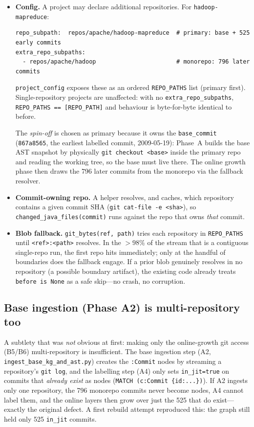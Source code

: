 \documentclass[11pt]{article}
\newcommand{\code}[1]{\texttt{#1}}
\begin{document}
\begin{itemize}
  \item \textbf{Config.} A project may declare additional repositories. For
  \code{hadoop-mapreduce}:
  \begin{lstlisting}
repo_subpath:  repos/apache/hadoop-mapreduce  # primary: base + 525 early commits
extra_repo_subpaths:
  - repos/apache/hadoop                       # monorepo: 796 later commits
  \end{lstlisting}
  \code{project\_config} exposes these as an ordered \code{REPO\_PATHS} list
  (primary first). Single-repository projects are unaffected: with no
  \code{extra\_repo\_subpaths}, \code{REPO\_PATHS == [REPO\_PATH]} and behaviour
  is byte-for-byte identical to before.

  The \emph{spin-off} is chosen as primary because it owns the
  \code{base\_commit} (\code{867a8565}, the earliest labelled commit,
  2009-05-19): Phase~A builds the base AST snapshot by physically
  \code{git checkout <base>} inside the primary repo and reading the working
  tree, so the base must live there. The online growth phase then draws the 796
  later commits from the monorepo via the fallback resolver.

  \item \textbf{Commit-owning repo.} A helper resolves, and caches, which
  repository contains a given commit SHA (\code{git cat-file -e <sha>}), so
  \code{changed\_java\_files(commit)} runs against the repo that owns
  \emph{that} commit.

  \item \textbf{Blob fallback.} \code{git\_bytes(ref, path)} tries each
  repository in \code{REPO\_PATHS} until \code{<ref>:<path>} resolves. In the
  $>98\%$ of the stream that is a contiguous single-repo run, the first repo
  hits immediately; only at the handful of boundaries does the fallback engage.
  If a prior blob genuinely resolves in no repository (a possible boundary
  artifact), the existing code already treats \code{before is None} as a safe
  skip---no crash, no corruption.
\end{itemize}

\subsection{Base ingestion (Phase A2) is multi-repository too}
A subtlety that was \emph{not} obvious at first: making only the online-growth
git access (B5/B6) multi-repository is insufficient. The base ingestion step
(A2, \code{ingest\_base\_kg\_and\_ast.py}) creates the \code{:Commit} nodes by
streaming a repository's \code{git log}, and the labelling step (A4) only sets
\code{in\_jit=true} on commits that \emph{already exist} as nodes
(\code{MATCH (c:Commit \{id:...\})}). If A2 ingests only one repository, the 796
monorepo commits never become nodes, A4 cannot label them, and the online layers
then grow over just the 525 that do exist---exactly the original defect. A first
rebuild attempt reproduced this: the graph still held only 525
\code{in\_jit} commits.
\end{document}
